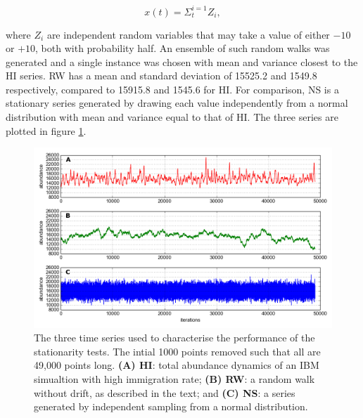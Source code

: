 \begin{equation}
	x(t) = \Sigma_{t}^{i=1} Z_i, 
\end{equation}   

where $Z_i$ are independent random variables that may take a value of either $-10$ or $+10$, both with probability half. An ensemble of such random walks was generated and a single instance was chosen with mean and variance closest to the HI series. RW has a mean and standard deviation of 15525.2 and 1549.8 respectively, compared to 15915.8 and 1545.6 for HI. For comparison, NS is a stationary series generated by drawing each value independently from a normal distribution with mean and variance  equal to that of HI. The three series are plotted in figure \ref{fig:adf}.
  
  
\begin{figure}[ht]
	\centering
	\includegraphics[width=0.8\linewidth]{"./chapters/chapter04b/figures/hi_rw_ns_dynamics"}
     \caption{The three time series used to characterise the performance of the stationarity tests. The intial 1000 points removed such that all are 49,000 points long. \textbf{(A) HI}: total abundance dynamics of an IBM simualtion with high immigration rate; \textbf{(B) RW}: a random walk without drift, as described in the text; and \textbf{(C) NS}: a series generated by independent sampling from a normal distribution.} 
     \label{fig:adf}   
\end{figure}


